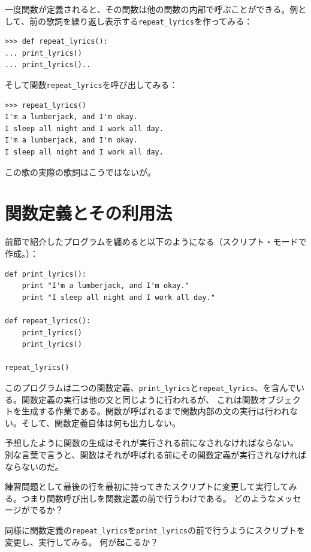 \documentclass[a4j,12pt,makeidx]{jbook}
\begin{document}
一度関数が定義されると、その関数は他の関数の内部で呼ぶことができる。例として、前の歌詞を繰り返し表示する{\tt repeat\_lyrics}を作ってみる：
\begin{verbatim}
>>> def repeat_lyrics():
...	print_lyrics()
...	print_lyrics()..	
\end{verbatim}
そして関数{\tt repeat\_lyrics}を呼び出してみる：
\begin{verbatim}
>>> repeat_lyrics()
I'm a lumberjack, and I'm okay.
I sleep all night and I work all day.
I'm a lumberjack, and I'm okay.
I sleep all night and I work all day.
\end{verbatim}
この歌の実際の歌詞はこうではないが。
%
\section{関数定義とその利用法}
前節で紹介したプログラムを纏めると以下のようになる（スクリプト・モードで作成。）：
\begin{verbatim}
def print_lyrics():
    print "I'm a lumberjack, and I'm okay."
    print "I sleep all night and I work all day."

def repeat_lyrics():
    print_lyrics()
    print_lyrics()

repeat_lyrics()
\end{verbatim}
%
このプログラムは二つの関数定義、{\tt print\_lyrics}と{\tt repeat\_lyrics}、を含んでいる。関数定義の実行は他の文と同じように行われるが、
これは関数オブジェクトを生成する作業である。関数が呼ばれるまで関数内部の文の実行は行われない。そして、関数定義自体は何も出力しない。\par
予想したように関数の生成はそれが実行される前になされなければならない。
別な言葉で言うと、関数はそれが呼ばれる前にその関数定義が実行されなければならないのだ。\par
練習問題として最後の行を最初に持ってきたスクリプトに変更して実行してみる。つまり関数呼び出しを関数定義の前で行うわけである。
どのようなメッセージがでるか？\par
同様に関数定義の{\tt repeat\_lyrics}を{\tt print\_lyrics}の前で行うようにスクリプトを変更し、実行してみる。
何が起こるか？
%
\end{document}
